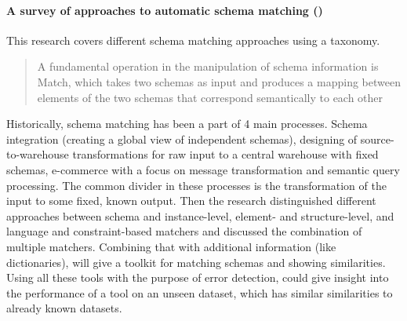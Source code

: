 \paragraph{A survey of approaches to automatic schema matching (\cite{Rahm2001-ei})}
This research covers different schema matching approaches using a taxonomy. 
\blockquote{A fundamental operation in the manipulation of schema information is Match, which takes two schemas as input and produces a mapping between elements of the two schemas that correspond semantically to each other}
Historically, schema matching has been a part of 4 main processes. Schema integration (creating a global view of independent schemas), designing of source-to-warehouse transformations for raw input to a central warehouse with fixed schemas, e-commerce with a focus on message transformation and semantic query processing. 
The common divider in these processes is the transformation of the input to some fixed, known output.  
Then the research distinguished different approaches between schema and instance-level, element- and structure-level, and language and constraint-based matchers and discussed the combination of multiple matchers. Combining that with additional information (like dictionaries), will give a toolkit for matching schemas and showing similarities. 
Using all these tools with the purpose of error detection, could give insight into the performance of a tool on an unseen dataset, which has similar similarities to already known datasets.

